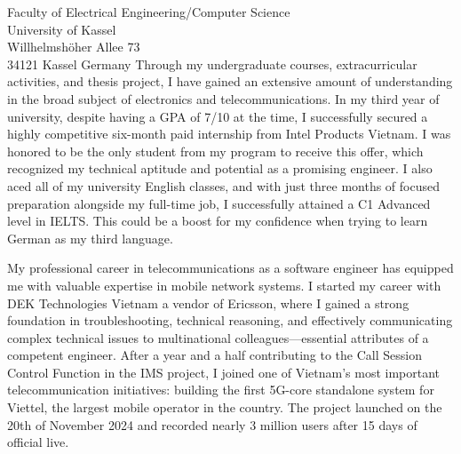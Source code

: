 \documentclass[a4paper,12pt]{letter}
\begin{document}
\begin{letter}{
    Faculty of Electrical Engineering/Computer Science
    \\ University of Kassel
    \\ Willhelmshöher Allee 73
    \\ 34121 Kassel Germany
}
Through my undergraduate courses, extracurricular activities, and thesis project, I have gained an extensive amount of understanding in the broad subject of electronics and telecommunications. In my third year of university, despite having a GPA of 7/10 at the time, I successfully secured a highly competitive six-month paid internship from Intel Products Vietnam. I was honored to be the only student from my program to receive this offer, which recognized my technical aptitude and potential as a promising engineer. I also aced all of my university English classes, and with just three months of focused preparation alongside my full-time job, I successfully attained a C1 Advanced level in IELTS. This could be a boost for my confidence when trying to learn German as my third language.

My professional career in telecommunications as a software engineer has equipped me with valuable expertise in mobile network systems. I started my career with DEK Technologies Vietnam a vendor of Ericsson, where I gained a strong foundation in troubleshooting, technical reasoning, and effectively communicating complex technical issues to multinational colleagues—essential attributes of a competent engineer. After a year and a half contributing to the Call Session Control Function in the IMS project, I joined one of Vietnam's most important telecommunication initiatives: building the first 5G-core standalone system for Viettel, the largest mobile operator in the country. The project launched on the 20th of November 2024 and recorded nearly 3 million users after 15 days of official live.




\end{letter}
\end{document}
